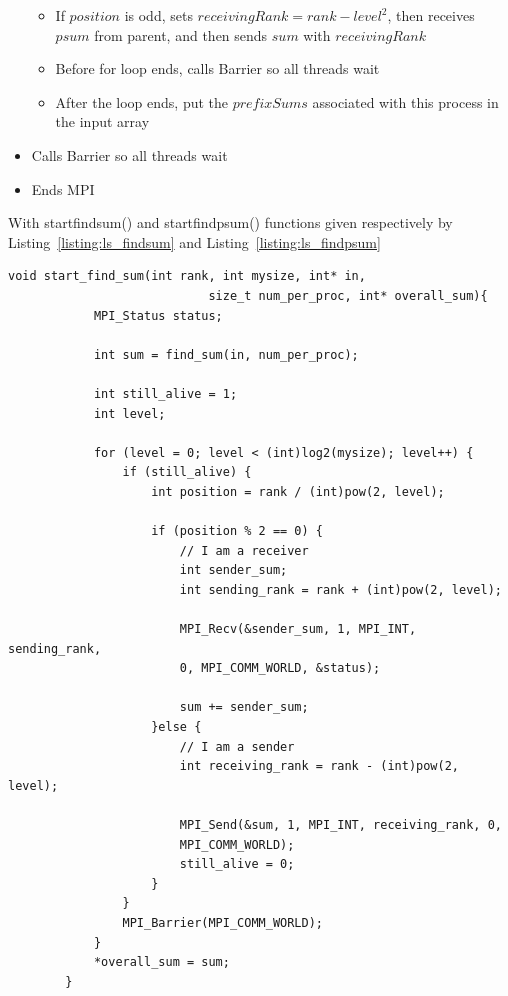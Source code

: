 \begin{itemize}
\begin{itemize}
			\item If $position$ is odd, sets $receivingRank = rank - level^2$, then receives $psum$ from parent, and then sends $sum$ with $receivingRank$
			\item Before for loop ends, calls Barrier so all threads wait
			\item After the loop ends, put the $prefixSums$ associated with this process in the input array
		\end{itemize}
		\item Calls Barrier so all threads wait
		\item Ends MPI
	\end{itemize}
	
	With start\textunderscore find\textunderscore sum() and start\textunderscore find\textunderscore psum() functions given respectively by Listing~\ref{listing:ls_findsum} and Listing~\ref{listing:ls_findpsum}
	\begin{lstlisting}[caption={start\textunderscore find\textunderscore sum()}, label={listing:ls_findsum}]
		void start_find_sum(int rank, int mysize, int* in, 
							size_t num_per_proc, int* overall_sum){
			MPI_Status status;
			
			int sum = find_sum(in, num_per_proc);
			
			int still_alive = 1;
			int level;
			
			for (level = 0; level < (int)log2(mysize); level++) {
				if (still_alive) {
					int position = rank / (int)pow(2, level);
					
					if (position % 2 == 0) {
						// I am a receiver
						int sender_sum;
						int sending_rank = rank + (int)pow(2, level);
						
						MPI_Recv(&sender_sum, 1, MPI_INT, sending_rank,
						0, MPI_COMM_WORLD, &status);
						
						sum += sender_sum;
					}else {
						// I am a sender
						int receiving_rank = rank - (int)pow(2, level);
						
						MPI_Send(&sum, 1, MPI_INT, receiving_rank, 0,
						MPI_COMM_WORLD);
						still_alive = 0;
					}
				}
				MPI_Barrier(MPI_COMM_WORLD);
			}
			*overall_sum = sum;
		}
	\end{lstlisting}
